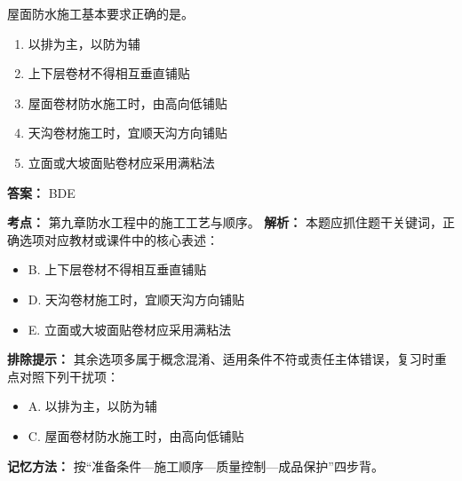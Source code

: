 \documentclass[UTF8,fontset=fandol,11pt]{ctexart}
\begin{document}
\begin{quizbox}[title={第 2 题}]
屋面防水施工基本要求正确的是。\\
\begin{enumerate}[label=\Alph*.]
\item 以排为主，以防为辅
\item 上下层卷材不得相互垂直铺贴
\item 屋面卷材防水施工时，由高向低铺贴
\item 天沟卷材施工时，宜顺天沟方向铺贴
\item 立面或大坡面贴卷材应采用满粘法
\end{enumerate}
\textbf{答案：} BDE
\vspace{0.25em}
\begin{answerbox}[title={考点解析}]
\textbf{考点：} 第九章防水工程中的施工工艺与顺序。
\textbf{解析：} 本题应抓住题干关键词，正确选项对应教材或课件中的核心表述：
\begin{itemize}
\item B. 上下层卷材不得相互垂直铺贴
\item D. 天沟卷材施工时，宜顺天沟方向铺贴
\item E. 立面或大坡面贴卷材应采用满粘法
\end{itemize}
\textbf{排除提示：} 其余选项多属于概念混淆、适用条件不符或责任主体错误，复习时重点对照下列干扰项：
\begin{itemize}
\item A. 以排为主，以防为辅
\item C. 屋面卷材防水施工时，由高向低铺贴
\end{itemize}
\textbf{记忆方法：} 按“准备条件—施工顺序—质量控制—成品保护”四步背。
\end{answerbox}
\end{quizbox}
\end{document}
